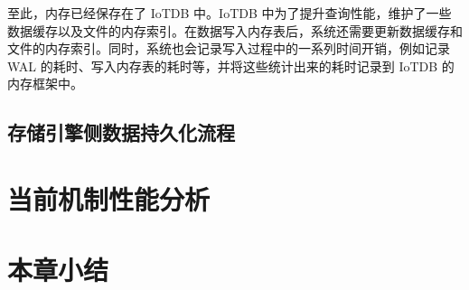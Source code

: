 至此，内存已经保存在了 IoTDB 中。IoTDB 中为了提升查询性能，维护了一些数据缓存以及文件的内存索引。在数据写入内存表后，系统还需要更新数据缓存和文件的内存索引。同时，系统也会记录写入过程中的一系列时间开销，例如记录 WAL 的耗时、写入内存表的耗时等，并将这些统计出来的耗时记录到 IoTDB 的内存框架中。
\subsection{存储引擎侧数据持久化流程}
\section{当前机制性能分析}
\section{本章小结}